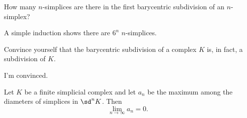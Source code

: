 \begin{problem}[15.24]
  How many $n$-simplices are there in the first barycentric subdivision of an
  $n$-simplex?
\end{problem}
\begin{solution}
  A simple induction shows there are $6^n$ $n$-simplices.
\end{solution}
\begin{problem}[15.25]
  Convince yourself that the barycentric subdivision of a complex $K$ is, in
  fact, a subdivision of $K$.
\end{problem}
\begin{solution}
  I'm convinced.
\end{solution}
\begin{problem}[15.26]
  Let $K$ be a finite simplicial complex and let $a_n$ be the maximum among the
  diameters of simplices in $\sd^n K$. Then
  \[
    \lim_{n\to\infty} a_n = 0.
  \]
\end{problem}
